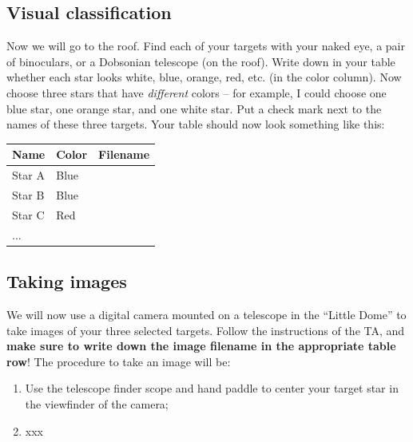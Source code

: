\documentclass[10pt]{article}%
\begin{document}
\subsection{Visual classification}
Now we will go to the roof. Find each of your targets with your naked eye, a pair of binoculars, or a Dobsonian telescope (on the roof). Write down in your table whether each star looks white, blue, orange, red, etc. (in the color column). Now choose three stars that have \emph{different} colors -- for example, I could choose one blue star, one orange star, and one white star. Put a check mark next to the names of these three targets. Your table should now look something like this:

\begin{center}
	\begin{tabular}{| p{3cm} | p{3cm} | p{5cm} |}
	\hline
	  \textbf{Name} & \textbf{Color} & \textbf{Filename} \\
	 \hline
	 \hline
	  Star A &  Blue &  \\
	  \hline
	  Star B \Checkmark & Blue &  \\
	  \hline
	  Star C \Checkmark & Red &  \\
	  \hline
	  ... &  & \\
	  \hline
	\end{tabular}
\end{center}

\subsection{Taking images}
We will now use a digital camera mounted on a telescope in the ``Little Dome'' to take images of your three selected targets. Follow the instructions of the TA, and \textbf{make sure to write down the image filename in the appropriate table row}! The procedure to take an image will be:

\begin{enumerate} 
	\item Use the telescope finder scope and hand paddle to center your target star in the viewfinder of the camera;
	\item xxx
\end{enumerate}
\end{document}
